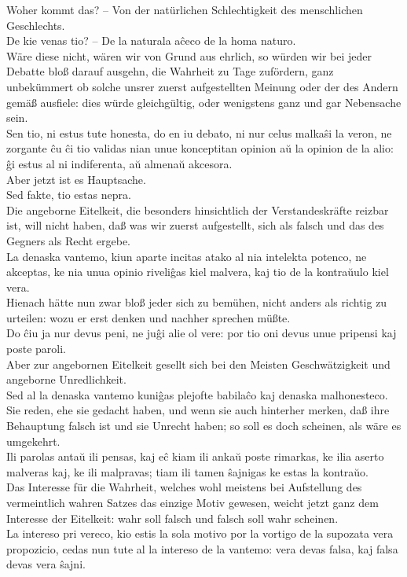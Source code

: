 \documentclass{book}
\newcommand{\de}[1]{{\color{red}#1}\\}
\newcommand{\eo}[1]{#1\\}
\newcommand{\eble}[1]{{\color{blue}#1}}
\begin{document}
\de{Woher kommt das? – Von der natürlichen Schlechtigkeit des
menschlichen Geschlechts. }
\eo{De kie venas tio? – De la \eble{naturala aĉeco de la homa naturo}.}
\de{Wäre diese nicht, wären wir von Grund aus ehrlich, so würden wir bei
jeder Debatte bloß darauf ausgehn, die Wahrheit zu Tage zufördern, ganz
unbekümmert ob solche unsrer zuerst aufgestellten Meinung oder der des
Andern gemäß ausfiele: dies würde gleichgültig, oder wenigstens ganz und
gar Nebensache sein. }
\eo{Sen tio, ni estus tute honesta, do en iu debato, ni nur celus malkaŝi
la veron, ne zorgante ĉu ĉi tio validas nian unue konceptitan opinion aŭ
la opinion de la alio: ĝi estus al ni indiferenta, aŭ almenaŭ akcesora.}
\de{Aber jetzt ist es Hauptsache. }
\eo{Sed fakte, tio estas nepra.}
\de{Die angeborne Eitelkeit, die besonders hinsichtlich der
Verstandeskräfte reizbar ist, will nicht haben, daß was wir zuerst
aufgestellt, sich als falsch und das des Gegners als Recht ergebe. }
\eo{La \eble{denaska} vantemo, kiun aparte incitas atako al nia
intelekta potenco, ne akceptas, ke nia unua opinio riveliĝas kiel
malvera, kaj tio de la kontraŭulo kiel vera.}
\de{Hienach hätte nun zwar bloß jeder sich zu bemühen, nicht anders als
richtig zu urteilen: wozu er erst denken und nachher sprechen müßte. }
\eo{Do ĉiu ja nur devus peni, ne juĝi alie ol vere: por tio oni devus
unue pripensi kaj poste paroli.}
\de{Aber zur angebornen Eitelkeit gesellt sich bei den Meisten
Geschwätzigkeit und angeborne Unredlichkeit. }
\eo{Sed al la \eble{denaska} vantemo kuniĝas plejofte babilaĉo kaj
\eble{denaska} malhonesteco.}
\de{Sie reden, ehe sie gedacht haben, und wenn sie auch hinterher merken,
daß ihre Behauptung falsch ist und sie Unrecht haben; so soll es doch
scheinen, als wäre es umgekehrt. }
\eo{Ili parolas antaŭ ili pensas, kaj eĉ kiam ili ankaŭ poste rimarkas,
ke ilia aserto malveras kaj, ke ili malpravas; tiam ili tamen ŝajnigas ke
estas la kontraŭo.}
\de{Das Interesse für die Wahrheit, welches wohl meistens bei Aufstellung
des vermeintlich wahren Satzes das einzige Motiv gewesen, weicht jetzt
ganz dem Interesse der Eitelkeit: wahr soll falsch und falsch soll wahr
scheinen.}
\eo{La intereso pri vereco, kio estis la sola motivo por la vortigo de la
supozata vera propozicio, cedas nun tute al la intereso de la vantemo:
vera devas falsa, kaj falsa devas vera ŝajni.}
\end{document}
